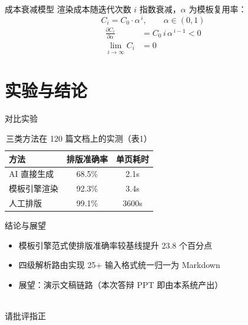 \documentclass{harryopo-slides}
\begin{document}
\begin{frame}{成本衰减模型}
渲染成本随迭代次数 $i$ 指数衰减，$\alpha$ 为模板复用率：
\[ C_i = C_0 \cdot \alpha^{\,i}, \qquad \alpha \in (0,1) \]
\begin{align}
\frac{\partial C_i}{\partial \alpha} &= C_0 \, i \, \alpha^{\,i-1} < 0 \\
\lim_{i \to \infty} C_i &= 0
\end{align}
\end{frame}

\section{实验与结论}
\begin{frame}{对比实验}
\begin{table}
\centering
\begin{tabular}{lcc}
\toprule
方法 & 排版准确率 & 单页耗时 \\
\midrule
AI 直接生成 & 68.5\% & 2.1s \\
模板引擎渲染 & \alert{92.3\%} & 3.4s \\
人工排版 & 99.1\% & 3600s \\
\bottomrule
\end{tabular}
\caption{三类方法在 120 篇文档上的实测（表1）}
\end{table}
\end{frame}

\begin{frame}{结论与展望}
\begin{itemize}
  \item 模板引擎范式使排版准确率较基线提升 \alert{23.8} 个百分点
  \item 四级解析路由实现 25+ 输入格式统一归一为 Markdown
  \item 展望：演示文稿链路（本次答辩 PPT 即由本系统产出）
\end{itemize}
\end{frame}

\begin{frame}[plain]
\begin{center}
\vspace{2em}{\Huge 谢谢各位老师}\\[1.5em]
{请批评指正}
\end{center}
\end{frame}
\end{document}
